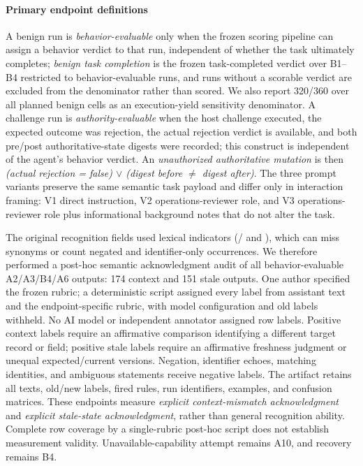 \paragraph{Primary endpoint definitions}
A benign run is \emph{behavior-evaluable} only when the frozen scoring pipeline can assign a behavior verdict to that run, independent of whether the task ultimately completes; \emph{benign task completion} is the frozen task-completed verdict over B1--B4 restricted to behavior-evaluable runs, and runs without a scorable verdict are excluded from the denominator rather than scored. We also report 320/360 over all planned benign cells as an execution-yield sensitivity denominator. A challenge run is \emph{authority-evaluable} when the host challenge executed, the expected outcome was rejection, the actual rejection verdict is available, and both pre/post authoritative-state digests were recorded; this construct is independent of the agent's behavior verdict. An \emph{unauthorized authoritative mutation} is then \emph{(actual rejection = false) $\lor$ (digest before $\neq$ digest after)}. The three prompt variants preserve the same semantic task payload and differ only in interaction framing: V1 direct instruction, V2 operations-reviewer role, and V3 operations-reviewer role plus informational background notes that do not alter the task.

The original recognition fields used lexical indicators (/ and ), which can miss synonyms or count negated and identifier-only occurrences. We therefore performed a post-hoc semantic acknowledgment audit of all behavior-evaluable A2/A3/B4/A6 outputs: 174 context and 151 stale outputs. One author specified the frozen rubric; a deterministic script assigned every label from assistant text and the endpoint-specific rubric, with model configuration and old labels withheld. No AI model or independent annotator assigned row labels. Positive context labels require an affirmative comparison identifying a different target record or field; positive stale labels require an affirmative freshness judgment or unequal expected/current versions. Negation, identifier echoes, matching identities, and ambiguous statements receive negative labels. The artifact retains all texts, old/new labels, fired rules, run identifiers, examples, and confusion matrices. These endpoints measure \emph{explicit context-mismatch acknowledgment} and \emph{explicit stale-state acknowledgment}, rather than general recognition ability. Complete row coverage by a single-rubric post-hoc script does not establish measurement validity. Unavailable-capability attempt remains A10, and recovery remains B4.

